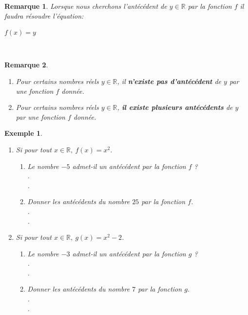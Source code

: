\documentclass[a4paper,10.5pt]{article}
\newtheorem{rmq}{Remarque}
\newtheorem{ex}{Exemple}
\newcommand{\R}{\mathbb{R}}
\begin{document}
\begin{rmq}
Lorsque nous cherchons l'antécédent de $y\in\R$ par la fonction $f$ il faudra résoudre l'équation: 

\centering \large$ f(x)=y$ 
\flushleft \normalsize
\end{rmq}\hfill\\[-2.5cm]
\begin{rmq}\hfill\\[-0.7cm]

\begin{enumerate}[$\bullet$]
\item Pour certains nombres réels $y\in\R$, il \textbf{n'existe pas d'antécédent} de $y$  par une fonction $f$ donnée. 
\item Pour certains nombres réels $y\in\R$, \textbf{il existe plusieurs antécédents} de $y$ par une fonction $f$ donnée. 
\end{enumerate}
\end{rmq}

\begin{ex}\hfil\\[-0.6cm]
	\begin{enumerate}
		\item Si pour tout  $x\in\R , \ f(x)= x^2 $. 
		\begin{enumerate}[$\square$]
			\item Le nombre  $-5$ admet-il un antécédent par la fonction $f$ ?\\
			.\dotfill\\
			.\dotfill 
			\item Donner les antécédents du nombre $25$ par la fonction $f$.\\
			.\dotfill\\
			.\dotfill  
		\end{enumerate}	
	\item Si pour tout  $x\in\R , \ g(x)= x^2 -2 $. 
	\begin{enumerate}[$\square$]
	\item Le nombre  $-3$ admet-il un antécédent par la fonction $g$ ?\\
	.\dotfill\\
	.\dotfill 
	\item Donner les antécédents du nombre $7$ par la fonction $g$.\\
	.\dotfill\\
	.\dotfill\\  
\end{enumerate} 
	\end{enumerate}
\end{ex}
\end{document}
